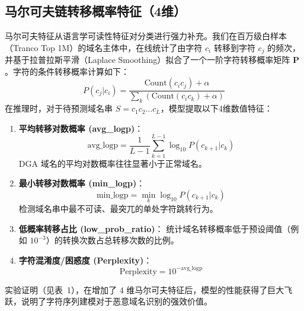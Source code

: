 \documentclass[11pt,a4paper]{ctexart}
\begin{document}
\subsection{马尔可夫链转移概率特征（4维）}
马尔可夫特征从语言学可读性特征对分类进行强力补充。我们在百万级白样本（Tranco Top 1M）的域名主体中，在线统计了由字符 $c_i$ 转移到字符 $c_j$ 的频次，并基于拉普拉斯平滑（Laplace Smoothing）拟合了一个一阶字符转移概率矩阵 $\mathbf{P}$。字符的条件转移概率计算如下：
\begin{equation}
    P(c_j | c_i) = \frac{\text{Count}(c_i c_j) + \alpha}{\sum_{k} \left( \text{Count}(c_i c_k) + \alpha \right)}
\end{equation}
在推理时，对于待预测域名串 $S = c_1 c_2 \dots c_L$，模型提取以下4维数值特征：
\begin{enumerate}
    \item \textbf{平均转移对数概率 (avg\_logp)}：
    \begin{equation}
        \text{avg\_logp} = \frac{1}{L - 1} \sum_{k=1}^{L-1} \log_{10} P(c_{k+1} | c_k)
    \end{equation}
    DGA 域名的平均对数概率往往显著小于正常域名。
    \item \textbf{最小转移对数概率 (min\_logp)}：
    \begin{equation}
        \text{min\_logp} = \min_{k} \log_{10} P(c_{k+1} | c_k)
    \end{equation}
    检测域名串中最不可读、最突兀的单处字符跳转行为。
    \item \textbf{低概率转移占比 (low\_prob\_ratio)}：
    统计域名转移概率低于预设阈值（例如 $10^{-3}$）的转换次数占总转移次数的比例。
    \item \textbf{字符混淆度/困惑度 (Perplexity)}：
    \begin{equation}
        \text{Perplexity} = 10^{-\text{avg\_logp}}
    \end{equation}
\end{enumerate}

实验证明（见表~1），在增加了 4 维马尔可夫特征后，模型的性能获得了巨大飞跃，说明了字符序列建模对于恶意域名识别的强效价值。
\end{document}
